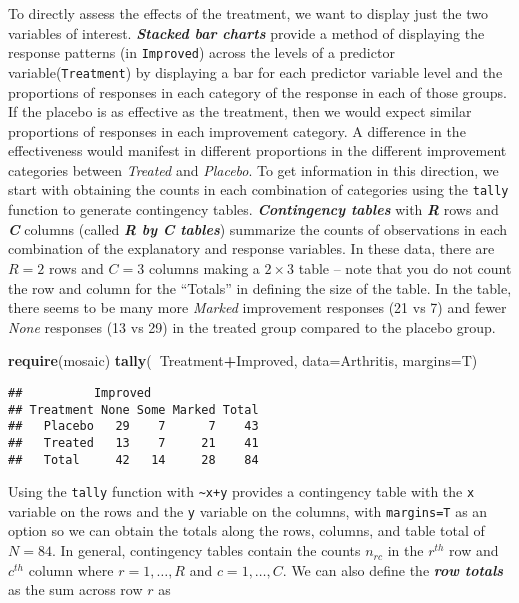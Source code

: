\documentclass[]{book}
\newenvironment{Shaded}{\begin{snugshade}}{\end{snugshade}}
\newcommand{\KeywordTok}[1]{\textcolor[rgb]{0.13,0.29,0.53}{\textbf{#1}}}
\newcommand{\DataTypeTok}[1]{\textcolor[rgb]{0.13,0.29,0.53}{#1}}
\newcommand{\OperatorTok}[1]{\textcolor[rgb]{0.81,0.36,0.00}{\textbf{#1}}}
\newcommand{\NormalTok}[1]{#1}
\theoremstyle{definition}
\theoremstyle{definition}
\theoremstyle{remark}
\begin{document}
To directly assess the effects of the treatment, we want to display just
the two variables of interest. \textbf{\emph{Stacked bar charts}}
provide a method of displaying the response patterns (in
\texttt{Improved}) across the levels of a predictor
variable(\texttt{Treatment}) by displaying a bar for each predictor
variable level and the proportions of responses in each category of the
response in each of those groups. If the placebo is as effective as the
treatment, then we would expect similar proportions of responses in each
improvement category. A difference in the effectiveness would manifest
in different proportions in the different improvement categories between
\emph{Treated} and \emph{Placebo}. To get information in this direction,
we start with obtaining the counts in each combination of categories
using the \texttt{tally} function to generate contingency tables.
\textbf{\emph{Contingency tables}} with \textbf{\emph{R}} rows and
\textbf{\emph{C}} columns (called \textbf{\emph{R by C tables}})
summarize the counts of observations in each combination of the
explanatory and response variables. In these data, there are \(R=2\)
rows and \(C=3\) columns making a \(2\times 3\) table -- note that you
do not count the row and column for the ``Totals'' in defining the size
of the table. In the table, there seems to be many more \emph{Marked}
improvement responses (21 vs 7) and fewer \emph{None} responses (13 vs
29) in the treated group compared to the placebo group.

\begin{Shaded}
\begin{Highlighting}[]
\KeywordTok{require}\NormalTok{(mosaic)}
\KeywordTok{tally}\NormalTok{(}\OperatorTok{~}\NormalTok{Treatment}\OperatorTok{+}\NormalTok{Improved, }\DataTypeTok{data=}\NormalTok{Arthritis, }\DataTypeTok{margins=}\NormalTok{T)}
\end{Highlighting}
\end{Shaded}

\begin{verbatim}
##          Improved
## Treatment None Some Marked Total
##   Placebo   29    7      7    43
##   Treated   13    7     21    41
##   Total     42   14     28    84
\end{verbatim}

Using the \texttt{tally} function with \texttt{\textasciitilde{}x+y}
provides a contingency table with the \texttt{x} variable on the rows
and the \texttt{y} variable on the columns, with \texttt{margins=T} as
an option so we can obtain the totals along the rows, columns, and table
total of \(N=84\). In general, contingency tables contain the counts
\(n_{rc}\) in the \(r^{th}\) row and \(c^{th}\) column where
\(r=1,\ldots,R\) and \(c=1,\ldots,C\). We can also define the
\textbf{\emph{row totals}} as the sum across row \(r\) as
\end{document}
